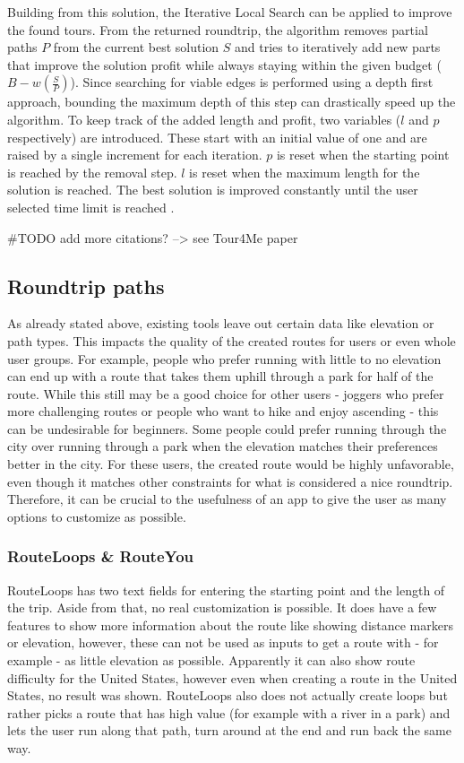 Building from this solution, the Iterative Local Search can be applied to improve the found tours.
From the returned roundtrip, the algorithm removes partial paths $P$ from the current best solution $S$ and tries to iteratively add new parts that improve the solution profit while always staying within the given budget ($B-w(\frac{S}{P})$).
Since searching for viable edges is performed using a depth first approach, bounding the maximum depth of this step can drastically speed up the algorithm.
To keep track of the added length and profit, two variables ($l$ and $p$ respectively) are introduced.
These start with an initial value of one and are raised by a single increment for each iteration.
$p$ is reset when the starting point is reached by the removal step.
$l$ is reset when the maximum length for the solution is reached.
The best solution is improved constantly until the user selected time limit is reached \cite{buchin_tour4me_2022}.

\#TODO add more citations? --> see Tour4Me paper

\subsection{Roundtrip paths}
\label{subsec:Roudtrip}
As already stated above, existing tools leave out certain data like elevation or path types.
This impacts the quality of the created routes for users or even whole user groups. 
For example, people who prefer running with little to no elevation can end up with a route that takes them uphill through a park for half of the route.
While this still may be a good choice for other users - joggers who prefer more challenging routes or people who want to hike and enjoy ascending - this can be undesirable for beginners.
Some people could prefer running through the city over running through a park when the elevation matches their preferences better in the city.
For these users, the created route would be highly unfavorable, even though it matches other constraints for what is considered a nice roundtrip.
Therefore, it can be crucial to the usefulness of an app to give the user as many options to customize as possible. 


\subsubsection{RouteLoops \& RouteYou}
\label{subsubsec:routeLoopsrouteYou}
RouteLoops has two text fields for entering the starting point and the length of the trip.
Aside from that, no real customization is possible.
It does have a few features to show more information about the route like showing distance markers or elevation, however, these can not be used as inputs to get a route with - for example - as little elevation as possible.
Apparently it can also show route difficulty for the United States, however even when creating a route in the United States, no result was shown. 
RouteLoops also does not actually create loops but rather picks a route that has high value (for example with a river in a park) and lets the user run along that path, turn around at the end and run back the same way.


